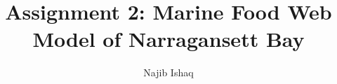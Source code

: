 \documentclass{article}
\title{Assignment 2: Marine Food Web Model of Narragansett Bay}
\author{
  Najib Ishaq \\
}
\begin{document}
    \maketitle

    
    \FloatBarrier
    

\end{document}
